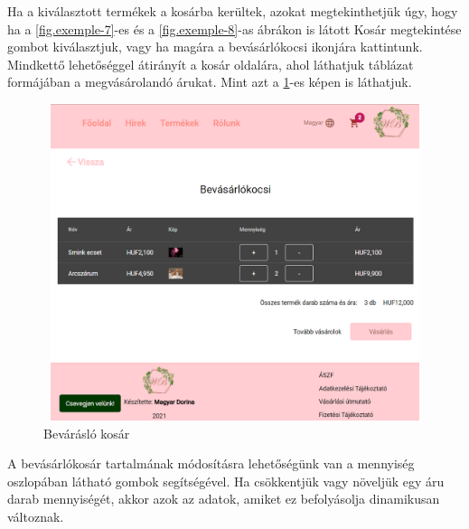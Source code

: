 Ha a kiválasztott termékek a kosárba kerültek, azokat megtekinthetjük úgy, hogy ha a \ref{fig.exemple-7}-es és a \ref{fig.exemple-8}-as ábrákon is látott Kosár megtekintése gombot kiválasztjuk, vagy ha magára a bevásárlókocsi ikonjára kattintunk. Mindkettő lehetőséggel átirányít a kosár oldalára, ahol láthatjuk táblázat formájában a megvásárolandó árukat. Mint azt a \ref{fig.exemple-9}-es képen is láthatjuk.
\begin{figure}[H]
	\centering
	\includegraphics[width=1.0\textwidth,height=350px]{images/kosar.png}
	\caption{Bevárásló kosár}
	\label{fig.exemple-9}
\end{figure}

A bevásárlókosár tartalmának módosításra lehetőségünk van a mennyiség oszlopában látható gombok segítségével. Ha csökkentjük vagy növeljük egy áru darab mennyiségét, akkor azok az adatok, amiket ez befolyásolja dinamikusan változnak.

